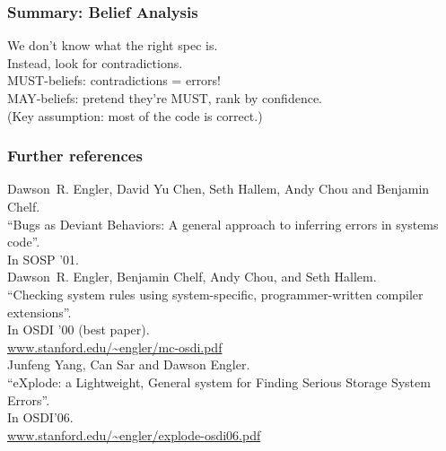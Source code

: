 \documentclass{beamer}
\newenvironment{changemargin}[1]{%
  \begin{list}{}{%
    \setlength{\topsep}{0pt}%
    \setlength{\leftmargin}{#1}%
    \setlength{\rightmargin}{1em}
    \setlength{\listparindent}{\parindent}%
    \setlength{\itemindent}{\parindent}%
    \setlength{\parsep}{\parskip}%
  }%
  \item[]}{\end{list}}
\begin{document}
\begin{frame}
  \frametitle{Summary: Belief Analysis}
    \begin{changemargin}{2cm}
      We don't know what the right spec is.\\
      Instead, look for contradictions.\\[2em]
      MUST-beliefs: contradictions = errors!\\[1em]
      MAY-beliefs: pretend they're MUST, rank by confidence.\\[2em]
      (Key assumption: most of the code is correct.)
    \end{changemargin}
\end{frame}

\begin{frame}
  \frametitle{Further references}

Dawson~R. Engler, David Yu Chen, Seth Hallem, Andy Chou and Benjamin Chelf.\\
``Bugs as Deviant Behaviors: A general approach to inferring errors in systems code''.\\
In SOSP '01.\\[1em]

Dawson~R. Engler, Benjamin Chelf, Andy Chou, and Seth Hallem.\\
``Checking system rules using system-specific, programmer-written
  compiler extensions''.\\
In OSDI '00 (best paper).\\
\url{www.stanford.edu/~engler/mc-osdi.pdf}\\[1em]

Junfeng Yang, Can Sar and Dawson Engler.\\
``eXplode: a Lightweight, General system for Finding Serious Storage System Errors''.\\
In OSDI'06.\\
\url{www.stanford.edu/~engler/explode-osdi06.pdf}
\end{frame}
\end{document}
